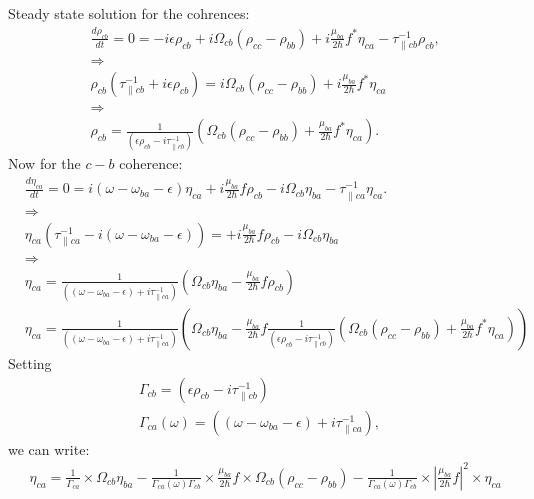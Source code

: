\documentclass[10pt,letterpaper]{article}
\begin{document}
	
	Steady state solution for the cohrences:
	\begin{align}
	&\frac{d \rho_{cb}}{d t}  = 0 =  -i\epsilon\rho_{cb} +i \Omega_{cb}(\rho_{cc} - \rho_{bb}) +i\frac{\mu_{ba}}{2 \hbar}f^*\eta_{ca}-\tau_{\parallel cb}^{-1} \rho_{cb},  \\
	&\Rightarrow \nonumber \\
	&\rho_{cb} (\tau_{\parallel cb}^{-1}+i\epsilon\rho_{cb}) = i \Omega_{cb}(\rho_{cc} - \rho_{bb}) +i\frac{\mu_{ba}}{2 \hbar}f^*\eta_{ca} \\
	&\Rightarrow \nonumber \\
	&\rho_{cb}  =\frac{1}{(\epsilon\rho_{cb}-i\tau_{\parallel cb}^{-1})} \left( \Omega_{cb}(\rho_{cc} - \rho_{bb}) +\frac{\mu_{ba}}{2 \hbar}f^*\eta_{ca} \right).
	\end{align}
	Now for the $c-b$ coherence:
	\begin{align}
	&\frac{d \eta_{ca}}{d t}  = 0 = i(\omega - \omega_{ba}-\epsilon)\eta_{ca} +i \frac{\mu_{ba}}{2\hbar}f\rho_{cb} - i\Omega_{cb}\eta_{ba} - \tau_{\parallel ca}^{-1}\eta_{ca}. \\
	&\Rightarrow \nonumber \\
	&\eta_{ca}(\tau_{\parallel ca}^{-1} -i(\omega - \omega_{ba}-\epsilon)) =  +i \frac{\mu_{ba}}{2\hbar}f\rho_{cb} - i\Omega_{cb}\eta_{ba}  \\
	&\Rightarrow \nonumber \\
	&\eta_{ca}=  \frac{1}{((\omega - \omega_{ba}-\epsilon)+i\tau_{\parallel ca}^{-1} ) } \left(\Omega_{cb}\eta_{ba} - \frac{\mu_{ba}}{2\hbar}f\rho_{cb} \right)  \\
	&\eta_{ca}=  \frac{1}{((\omega - \omega_{ba}-\epsilon)+i\tau_{\parallel ca}^{-1} ) } \left(\Omega_{cb}\eta_{ba} - \frac{\mu_{ba}}{2\hbar}f\frac{1}{(\epsilon\rho_{cb}-i\tau_{\parallel cb}^{-1})} \left( \Omega_{cb}(\rho_{cc} - \rho_{bb}) +\frac{\mu_{ba}}{2 \hbar}f^*\eta_{ca} \right) \right)
	\end{align}
	Setting
	\begin{align}
	\Gamma_{cb} = (\epsilon\rho_{cb}-i\tau_{\parallel cb}^{-1}) \\
	\Gamma_{ca}(\omega) = ((\omega - \omega_{ba}-\epsilon)+i\tau_{\parallel ca}^{-1} ),
	\end{align}
	we can write:
	\begin{align}
	&\eta_{ca}=  \frac{1}{ \Gamma_{ca} } \times \Omega_{cb}\eta_{ba} - \frac{1}{\Gamma_{ca}(\omega)\Gamma_{cb}}\times \frac{\mu_{ba}}{2 \hbar}f\times \Omega_{cb}(\rho_{cc} - \rho_{bb})- \frac{1}{\Gamma_{ca}(\omega)\Gamma_{cb}}\times|\frac{\mu_{ba}}{2 \hbar}f|^2\times\eta_{ca}
	\end{align}
\end{document}
